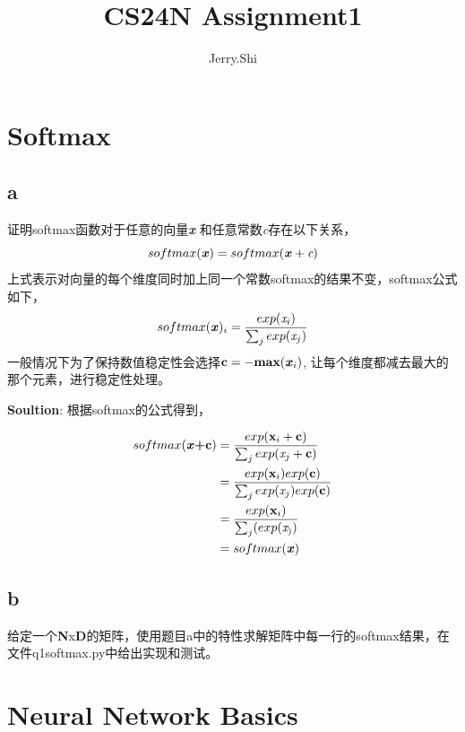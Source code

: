 \documentclass[twoside,nofonts,fancyhdr,openany,UTF8,fleqn]{ctexart} %
\title{CS24N Assignment1}    	%
\author{Jerry.Shi}		%
\begin{document}



\section{Softmax}
\subsection{a}
证明softmax函数对于任意的向量\textbf{\emph{x}} 和任意常数\emph{c}存在以下关系，
\begin{equation}
softmax(\textbf{\emph{x}}) = softmax(\textbf{\emph{x}} + \emph{c})
\end{equation}
上式表示对向量的每个维度同时加上同一个常数softmax的结果不变，softmax公式如下，
\begin{equation}
softmax(\textbf{\emph{x}})_i = \frac{exp(\emph{x}_i)}{\sum_{j}exp(\emph{x}_j)}
\end{equation}
一般情况下为了保持数值稳定性会选择$\textbf{c}=-\textbf{max}(\textbf{\emph{x}}_i)$, 让每个维度都减去最大的那个元素，进行稳定性处理。

\textbf{Soultion}:
根据softmax的公式得到，

\begin{align}
softmax(\textbf{\emph{x}+c})  & =  \frac{exp(\textbf{x}_i + \textbf{c})}{\sum_{j}exp(\emph{x}_j+\textbf{c})} \\
								  & =  \frac{exp(\textbf{x}_i)exp(\textbf{c})}{\sum_{j}exp(\emph{x}_j)exp(\textbf{c})}	\\
								  & = \frac{exp(\textbf{x}_i)}{\sum_{j}(exp(\emph{x}_))}	\\
								  & = softmax(\textbf{\emph{x}}) 
\end{align} %

\subsection{b}
给定一个\textbf{N}x\textbf{D}的矩阵，使用题目a中的特性求解矩阵中每一行的softmax结果，在文件q1softmax.py中给出实现和测试。


\section{Neural Network Basics}
\end{document}
